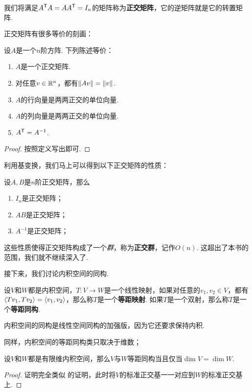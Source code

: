 我们将满足$A^{\mathsf{T}} A=AA^{\mathsf{T}}=I_n$的矩阵称为\textbf{正交矩阵}，它的逆矩阵就是它的转置矩阵. 

正交矩阵有很多等价的刻画：

\begin{theorem}\label{theorem:orthogonal-matrix}
设$A$是一个$n$阶方阵. 下列陈述等价：
\begin{enumerate}
    \item $A$是一个正交矩阵.
    \item 对任意$v\in\mathbb{R}^n$，都有$\left\|Av\right\|=\left\|v\right\|$. 
    \item $A$的行向量是两两正交的单位向量.
    \item $A$的列向量是两两正交的单位向量.
    \item $A^{\mathsf{T}}=A^{-1}$.
\end{enumerate}
\end{theorem}
\begin{proof}
    按照定义写出即可. 
\end{proof}

利用基变换，我们马上可以得到以下正交矩阵的性质：

\begin{proposition}\label{proposition:orthogonal-matrix-property}
设$A,B$是$n$阶正交矩阵，那么
\begin{enumerate}
    \item $I_n$是正交矩阵；
    \item $AB$是正交矩阵；
    \item $A^{-1}$是正交矩阵；
\end{enumerate}
\end{proposition}

这些性质使得正交矩阵构成了一个\textit{群}，称为\textbf{正交群}，记作$O(n)$. 这超出了本书的范围，我们就不继续深入了.


接下来，我们讨论内积空间的同构. 

\begin{definition}[等距映射与等距同构]\label{definition:isometry}
设$V$和$W$都是内积空间，$T:V\to W$是一个线性映射，如果对任意的$v_1,v_2\in V$，都有$\left\langle{Tv_1},{Tv_2}\right\rangle=\left\langle{v_1},{v_2}\right\rangle$，那么称$T$是一个\textbf{等距映射}. 如果$T$是一个双射，那么称$T$是一个\textbf{等距同构}.
\end{definition}

内积空间的同构是线性空间同构的加强版，因为它还要求保持内积.

同样，内积空间的等距同构类只取决于维数；

\begin{theorem}\label{theorem:isometry}
设$V$和$W$都是有限维内积空间，那么$V$与$W$等距同构当且仅当$\dim V=\dim W$. 
\end{theorem}
\begin{proof}
    证明完全类似 的证明，此时将$V$的标准正交基一一对应到$W$的标准正交基上.
\end{proof}

